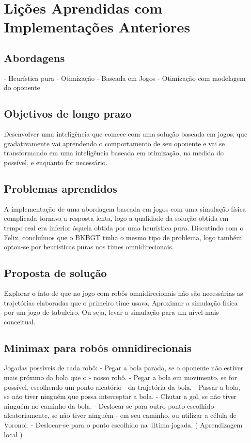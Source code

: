 \chapter{Lições Aprendidas com Implementações Anteriores}

\section{Abordagens}
- Heurística pura
- Otimização
- Baseada em Jogos
- Otimização com modelagem do oponente

\section{Objetivos de longo prazo}
Desenvolver uma inteligência que comece com
uma solução baseada em jogos, que
gradativamente vai aprendendo o
comportamento de seu oponente e vai se
transformando em uma inteligência baseada
em otimização, na medida do possível, e
enquanto for necessário.

\section{Problemas aprendidos}
A implementação de uma abordagem baseada
em jogos com uma simulação física complicada
tornava a resposta lenta, logo a qualidade da
solução obtida em tempo real era inferior
àquela obtida por uma heurística pura.
Discutindo com o Felix, concluímos que o
BKBGT tinha o mesmo tipo de problema, logo
também optou-se por heurísticas puras nos
times omnidirecionais.

\section{Proposta de solução}
Explorar o fato de que no jogo com robôs
omnidirecionais não são necessárias as
trajetórias elaboradas que o primeiro time
usava.
Aproximar a simulação física por um jogo de
tabuleiro. Ou seja, levar a simulação para um
nível mais conceitual.

\section{Minimax para robôs omnidirecionais}
Jogadas possíveis de cada robô:
  - Pegar a bola parada, se o oponente não estiver mais próximo da bola que o
  - nosso robô.
  - Pegar a bola em movimento, se for possível, escolhendo um ponto aleatório
  - da trajetória da bola.
  - Passar a bola, se não tiver ninguém que possa interceptar a bola.
  - Chutar a gol, se não tiver ninguém no caminho da bola.
  - Deslocar-se para outro ponto escolhido aleatoriamente, se não tiver ninguém
  - em seu caminho, ou utilizar a célula de Voronoi.
  - Deslocar-se para o ponto escolhido na última jogada. ( Aprendizagem local )

